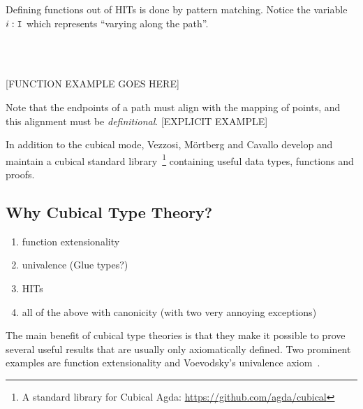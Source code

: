 Defining functions out of HITs is done by pattern matching. Notice the variable
$i:\texttt{I}$ which represents ``varying along the path''.

\begin{code}%
\>[0]\AgdaSpace{}%
\AgdaSymbol{:}\AgdaSpace{}%
\AgdaSpace{}%
\AgdaSpace{}%
\<%
\\
\>[0]\AgdaSpace{}%
\AgdaSpace{}%
\AgdaSymbol{=}\AgdaSpace{}%
\<%
\\
\>[0]\AgdaSpace{}%
\AgdaSymbol{(}\AgdaSpace{}%
\AgdaSymbol{)}\AgdaSpace{}%
\AgdaSymbol{=}\AgdaSpace{}%
\AgdaSpace{}%
\AgdaSymbol{(}\AgdaOperator{\AgdaPrimitive{\textasciitilde{}}}\AgdaSpace{}%
\AgdaSymbol{)}\<%
\end{code}

[FUNCTION EXAMPLE GOES HERE]

Note that the endpoints of a path must align with the mapping of points, and
this alignment must be \emph{definitional}. [EXPLICIT EXAMPLE]

In addition to the cubical mode, Vezzosi, M\"ortberg and Cavallo develop and
maintain a cubical standard library~\footnote[1]{A standard library for Cubical
  Agda: \url{https://github.com/agda/cubical}} containing useful data types,
functions and proofs.

\subsection{Why Cubical Type Theory?}
\begin{enumerate}
  \item function extensionality
  \item univalence (Glue types?)
  \item HITs
  \item all of the above with canonicity (with two very annoying exceptions)
\end{enumerate}

The main benefit of cubical type theories is that they make it possible to prove
several useful results that are usually only axiomatically defined. Two
prominent examples are function extensionality and Voevodsky's univalence
axiom~\cite{voevodsky2014}.

